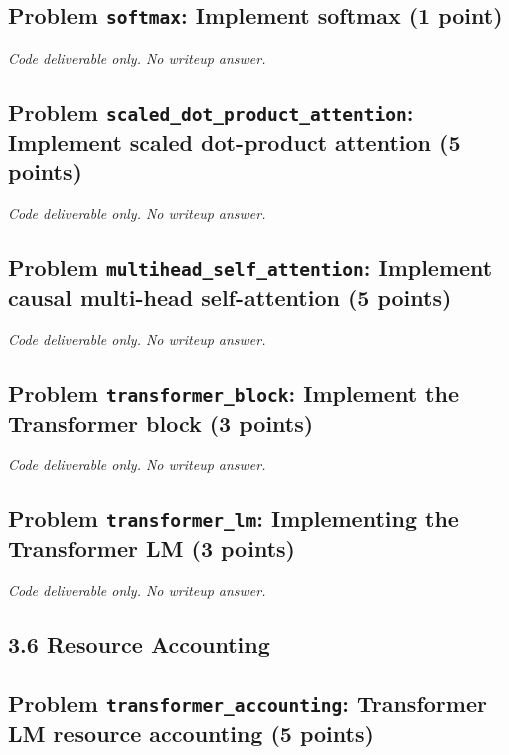 \documentclass[11pt]{article}
\newcommand{\CodeOnly}{\par\emph{Code deliverable only. No writeup answer.}\par}
\newcommand{\problem}[2]{%
  \subsection*{Problem \texttt{#1}: #2}%
}
\begin{document}
\problem{softmax}{Implement softmax (1 point)}

\CodeOnly

\problem{scaled\_dot\_product\_attention}{Implement scaled dot-product attention (5 points)}

\CodeOnly

\problem{multihead\_self\_attention}{Implement causal multi-head self-attention (5 points)}

\CodeOnly

\problem{transformer\_block}{Implement the Transformer block (3 points)}

\CodeOnly

\problem{transformer\_lm}{Implementing the Transformer LM (3 points)}

\CodeOnly

\subsection*{3.6 Resource Accounting}

\problem{transformer\_accounting}{Transformer LM resource accounting (5 points)}
\end{document}
